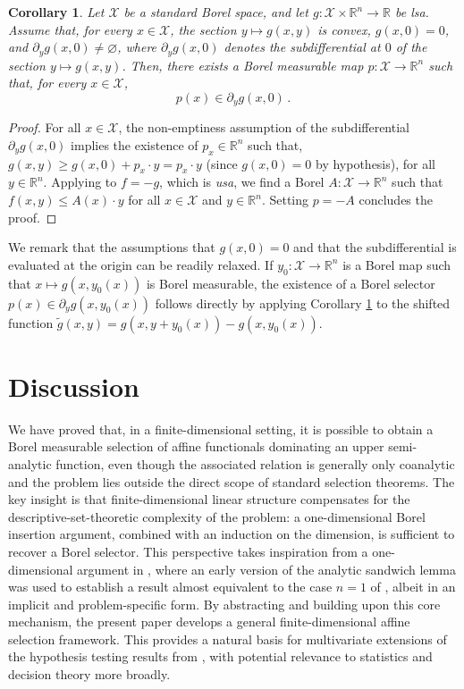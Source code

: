 \documentclass[10pt, a4paper]{article}
\newcommand{\lsa}{\emph{lsa}\xspace}
\newcommand{\R}{\mathbb R}
\newcommand{\usa}{\emph{usa}\xspace}
\newcommand{\X}{\mathcal X}
\newtheorem{corollary}{Corollary}
\begin{document}
\begin{corollary}\label{cor:subgradient}
Let $\X$ be a standard Borel space, and let $g:\X\times\R^n\to\R$ be \lsa. Assume that, for every $x\in\X$, the section $y\mapsto g(x,y)$ is convex, $g(x,0)=0$, and $\partial_y g(x,0)\neq\varnothing$, where $\partial_y g(x,0)$ denotes the subdifferential at $0$ of the section $y\mapsto g(x,y)$. Then, there exists a Borel measurable map $p:\X\to\R^n$ such that, for every $x\in\X$,
$$p(x)\in\partial_y g(x,0)\,.$$
\end{corollary}
\begin{proof}
    For all $x\in\X$, the non-emptiness assumption of the subdifferential $\partial_y g(x,0)$ implies the existence of  $p_x \in \R^n$ such that, $g(x,y) \geq g(x,0) + p_x \cdot y = p_x\cdot y$ (since $g(x,0)=0$ by hypothesis), for all $y \in \R^n$. Applying  to $f = -g$, which is \usa, we find a Borel $A:\X\to\R^n$ such that $f(x,y)\leq A(x)\cdot y$ for all $x\in\X$ and $y\in\R^n$. Setting $p=-A$ concludes the proof. 
\end{proof}
We remark that the assumptions that $g(x,0) = 0$ and that the subdifferential is evaluated at the origin can be readily relaxed. If $y_0:\X\to\R^n$ is a Borel map such that $x \mapsto g(x,y_0(x))$ is Borel measurable, the existence of a Borel  selector $p(x) \in \partial_y g(x, y_0(x))$ follows directly by applying Corollary \ref{cor:subgradient} to the shifted function $\tilde{g}(x,y) = g(x, y + y_0(x)) - g(x,y_0(x))$.





\section{Discussion}

We have proved that, in a finite-dimensional setting, it is possible to obtain a Borel measurable selection of affine functionals dominating an upper semi-analytic function, even though the associated relation is generally only coanalytic and the problem lies outside the direct scope of standard selection theorems. The key insight is that finite-dimensional linear structure compensates for the descriptive-set-theoretic complexity of the problem: a one-dimensional Borel insertion argument, combined with an induction on the dimension, is sufficient to recover a Borel selector. This perspective takes inspiration from a one-dimensional argument in \cite{clerico2025optimality}, where an early version of the analytic sandwich lemma was used to establish a result almost equivalent to the case $n=1$ of , albeit in an implicit and problem-specific form. By abstracting and building upon this core mechanism, the present paper develops a general finite-dimensional affine selection framework. This provides a natural basis for multivariate extensions of the hypothesis testing results from \cite{clerico2025optimality}, with potential relevance to statistics and decision theory more broadly.
\end{document}
